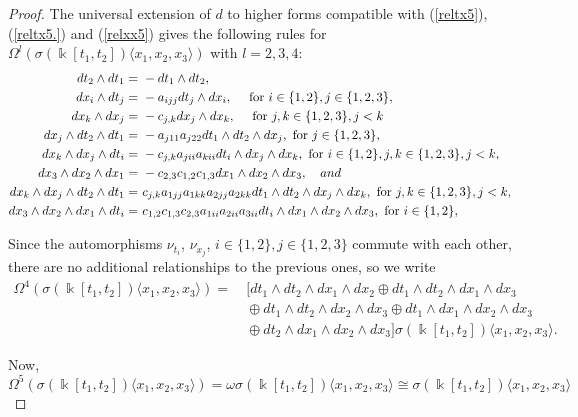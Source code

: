 \documentclass{amsart}
\theoremstyle{definition}
\theoremstyle{remark}
\numberwithin{equation}{section}
\begin{document}
\begin{proof}
The universal extension of $d$ to higher forms compatible with {\rm (}\ref{reltx5}{\rm )}, {\rm (}\ref{reltx5.}{\rm )} and {\rm (}\ref{relxx5}{\rm )} gives the following rules for $\Omega^l(\sigma(\Bbbk[t_1, t_2])\langle x_1, x_2, x_3\rangle)$ with $l = 2, 3, 4$:
{\footnotesize{
\begin{align}\label{rel3wedge23}
 dt_2 \wedge dt_1  = &\ - dt_1 \wedge dt_2, \\
 dx_i\wedge dt_j = &\ -a_{ijj}dt_j\wedge dx_i, \quad \text{ for } i\in\{1, 2\}, j \in\{1, 2, 3\}, \notag \\
 dx_k\wedge dx_j = &\ -c_{j,k}dx_j\wedge dx_k, \quad \text{ for } j, k \in\{1, 2, 3\}, j<k \notag \\
dx_j\wedge dt_2\wedge dt_1 = &\ -a_{j11}a_{j22}dt_1\wedge dt_2\wedge dx_j, \text{ for } j \in\{1, 2, 3\}, \notag  \\
dx_k\wedge dx_j\wedge dt_i = &\ -c_{j,k}a_{jii}a_{kii}dt_i\wedge dx_j\wedge dx_k, \text{ for } i\in\{1, 2\}, j,k \in\{1, 2, 3\}, j <k, \notag  \\
dx_3\wedge dx_2\wedge dx_1 = &\ -c_{2,3}c_{1,2}c_{1,3}dx_1\wedge dx_2\wedge dx_3, \quad {\rm and} \notag \\
dx_k\wedge dx_j\wedge dt_2\wedge dt_1 = &\  c_{j, k}a_{1jj}a_{1kk}a_{2jj}a_{2kk}dt_1\wedge dt_2\wedge dx_j \wedge dx_k, \text{ for } j,k \in\{1, 2, 3\}, j <k,\notag \\
dx_3\wedge dx_2\wedge dx_1\wedge dt_i = &\  c_{1, 2}c_{1, 3}c_{2, 3}a_{1ii}a_{2ii}a_{3ii}dt_i\wedge dx_1\wedge dx_2 \wedge dx_3, \text{ for } i \in\{1, 2\},\notag 
\end{align}
}}

Since the automorphisms $\nu_{t_i}$, $\nu_{x_j}$, $i\in\{1, 2\}, j \in\{1, 2, 3\}$ commute with each other, there are no additional relationships to the previous ones, so we write
\begin{align*}
\Omega^{4}(\sigma(\Bbbk[t_1, t_2])\langle x_1, x_2, x_3\rangle) = &\ [dt_1\wedge dt_2\wedge dx_1 \wedge dx_2 \oplus dt_1\wedge dt_2\wedge dx_1 \wedge dx_3 \\
&\ \oplus dt_1\wedge dt_2\wedge dx_2 \wedge dx_3  \oplus dt_1\wedge dx_1\wedge dx_2 \wedge dx_3 \\
&\ \oplus dt_2\wedge dx_1\wedge dx_2 \wedge dx_3] \sigma(\Bbbk[t_1, t_2])\langle x_1, x_2, x_3\rangle.
\end{align*}

Now, 
$$
\Omega^5(\sigma(\Bbbk[t_1, t_2])\langle x_1, x_2, x_3\rangle) = \omega\sigma(\Bbbk[t_1, t_2])\langle x_1, x_2, x_3\rangle\cong \sigma(\Bbbk[t_1, t_2])\langle x_1, x_2, x_3\rangle
$$ 


\end{proof}
\end{document}
